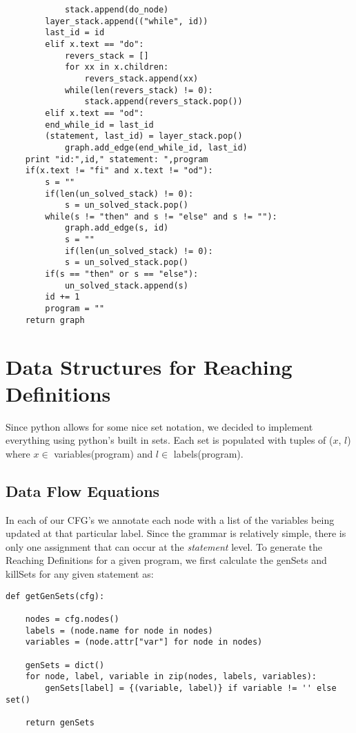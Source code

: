 \documentclass{article}
\begin{document}
{\begin{verbatim}
            stack.append(do_node)
	    layer_stack.append(("while", id))
	    last_id = id
        elif x.text == "do":
            revers_stack = []
            for xx in x.children:
                revers_stack.append(xx)
            while(len(revers_stack) != 0):
                stack.append(revers_stack.pop())
        elif x.text == "od":
	    end_while_id = last_id
	    (statement, last_id) = layer_stack.pop()
            graph.add_edge(end_while_id, last_id)
	print "id:",id," statement: ",program
	if(x.text != "fi" and x.text != "od"):
	    s = ""
	    if(len(un_solved_stack) != 0):
	        s = un_solved_stack.pop()
	    while(s != "then" and s != "else" and s != ""):
	        graph.add_edge(s, id)
    		s = ""
	        if(len(un_solved_stack) != 0):
		    s = un_solved_stack.pop()
	    if(s == "then" or s == "else"):
	        un_solved_stack.append(s)
        id += 1
        program = ""
    return graph
\end{verbatim}

\section{Data Structures for Reaching Definitions}
Since python allows for some nice set notation, we decided to
implement everything using python's built in sets. Each set is
populated with tuples of ($x$, $l$) where $x \in$ variables(program)
and $l \in$ labels(program). 

\subsection{Data Flow Equations}
In each of our CFG's we annotate each node with a list of the variables being updated at that particular label. Since the grammar is relatively simple, there is only one assignment that can occur at the \emph{statement} level. To generate the Reaching Definitions for a given program, we first calculate the genSets and killSets for any given statement as:

\begin{verbatim}
def getGenSets(cfg):

    nodes = cfg.nodes()
    labels = (node.name for node in nodes)
    variables = (node.attr["var"] for node in nodes)

    genSets = dict()
    for node, label, variable in zip(nodes, labels, variables):
        genSets[label] = {(variable, label)} if variable != '' else set()

    return genSets



\end{verbatim}}
\end{document}
